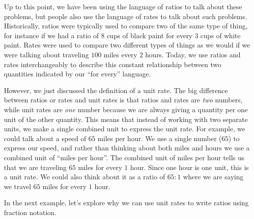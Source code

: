 \documentclass{ximera}
\begin{document}
Up to this point, we have been using the language of ratios to talk about these problems, but people also use the language of rates to talk about such problems. Historically, ratios were typically used to compare two of the same type of thing, for instance if we had a ratio of $8$ cups of black paint for every $3$ cups of white paint. Rates were used to compare two different types of things as we would if we were talking about traveling $100$ miles every $2$ hours. Today, we use ratios and rates interchangeably to describe this constant relationship between two quantities indicated by our ``for every'' language. 


However, we just discussed the definition of a unit rate. The big difference between ratios or rates and unit rates is that ratios and rates are \emph{two} numbers, while unit rates are \emph{one} number because we are always giving a quantity per one unit of the other quantity. This means that instead of working with two separate units, we make a single combined unit to express the unit rate. For example, we could talk about a speed of $65$ miles per hour. We use a single number ($65$) to express our speed, and rather than thinking about both miles and hours we use a combined unit of ``miles per hour''.  The combined unit of miles per hour tells us that we are traveling $65$ miles for every $1$ hour. Since one hour is one unit, this is a unit rate. We could also think about it as a ratio of $65:1$ where we are saying we travel $65$ miles for every $1$ hour. 

In the next example, let's explore why we can use unit rates to write ratios using fraction notation.
\end{document}
